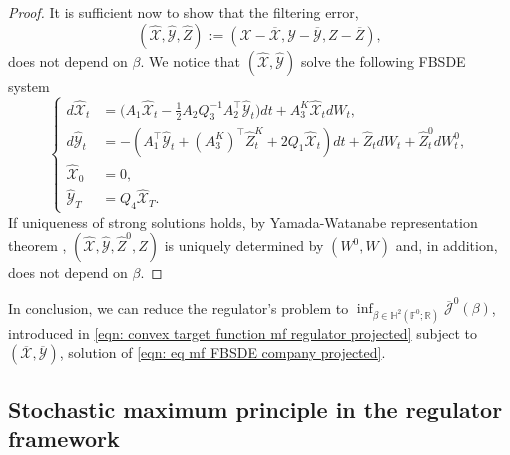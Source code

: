 \documentclass[10pt,a4paper]{amsart}
\numberwithin{equation}{section}
\newcommand{\F}{\mathbb{F}}
\newcommand{\R}{\mathbb{R}}
\renewcommand{\bar}{\overline}
\renewcommand{\hat}{\widehat}
\begin{document}
\begin{proof}
It is sufficient now to show that the filtering error,
\begin{equation*}
(\hat{\mathcal{X}} , \hat{\mathcal{Y}}, \hat{Z}) := 
(\mathcal{X} - \bar{\mathcal{X}}, \mathcal{Y} - \bar{\mathcal{Y}}, Z - \bar{Z}),
\end{equation*}
does not depend on $\beta$. We notice that $(\hat{\mathcal{X}} , \hat{\mathcal{Y}})$ solve the following FBSDE system
\begin{equation*}
    \begin{cases}
d\hat{\mathcal{X}}_t&=   \big( A_1 \hat{\mathcal{X}}_t - \frac{1}{2}A_2Q_3^{-1}  A_2^\top\hat{\mathcal{Y}}_t\big) dt  + A^K_3\hat{\mathcal{X}}_tdW_t,\\
d\hat{\mathcal{Y}}_t &= - (A^\top_1 \hat{\mathcal{Y}}_t+ (A^K_3)^\top \hat{Z}^{K}_t+ 2Q_1 \hat{\mathcal{X}}_t )dt+ \hat{Z}_t dW_t+ \hat{Z}^0_t dW^0_t, \\
\hat{\mathcal{X}}_0 &= 0,\\
\hat{\mathcal{Y}}_T &= Q_4\hat{\mathcal{X}}_T.
    \end{cases}
\end{equation*}
If uniqueness of strong solutions holds, by Yamada-Watanabe representation theorem \cite[Theorem 1.33]{carmona2018probabilistic2}, $ (\hat{\mathcal{X}}, \hat{\mathcal{Y}}, \hat{Z}^0, \hat{Z})$ is uniquely determined by $(W^0,W)$ and, in addition, does not depend on $\beta$. 
\end{proof}

In conclusion, we can reduce the regulator's problem to $\inf_{\beta \in \mathbb{H}^2(\F^0; \R)}\bar{\mathcal{J}}^0(\beta)$, introduced in \eqref{eqn: convex target function mf regulator projected} subject to $(\bar{\mathcal{X}},\bar{\mathcal{Y}})$, solution of \eqref{eqn: eq mf FBSDE company projected}. 

\subsection{Stochastic maximum principle in the regulator framework}
\end{document}
